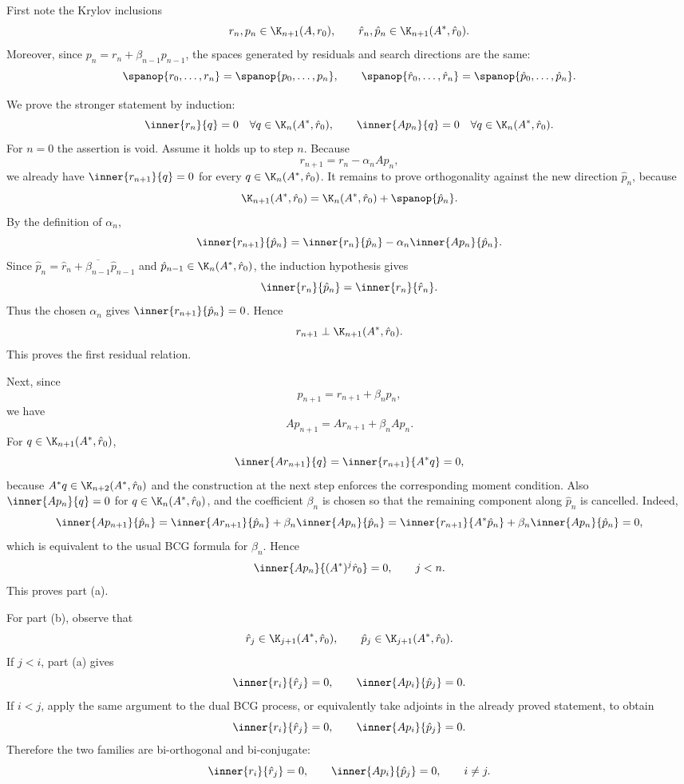 \documentclass{ctexart}
\begin{document}
\begin{solution}
  First note the Krylov inclusions
  \[
    r_n,p_n\in \K_{n+1}(A,r_0),\qquad
    \hat r_n,\hat p_n\in \K_{n+1}(A^*,\hat r_0).
  \]
  Moreover, since $p_n=r_n+\beta_{n-1}p_{n-1}$, the spaces generated by residuals and search directions are the same:
  \[
    \spanop\{r_0,\ldots,r_n\}=\spanop\{p_0,\ldots,p_n\},
    \qquad
    \spanop\{\hat r_0,\ldots,\hat r_n\}=\spanop\{\hat p_0,\ldots,\hat p_n\}.
  \]

  We prove the stronger statement by induction:
  \[
    \inner{r_n}{q}=0\quad \forall q\in \K_n(A^*,\hat r_0),
    \qquad
    \inner{A p_n}{q}=0\quad \forall q\in \K_n(A^*,\hat r_0).
  \]
  For $n=0$ the assertion is void.  Assume it holds up to step $n$.  Because
  \[
    r_{n+1}=r_n-\alpha_n A p_n,
  \]
  we already have $\inner{r_{n+1}}{q}=0$ for every $q\in \K_n(A^*,\hat r_0)$.  It remains to prove orthogonality against the new direction $\hat p_n$, because
  \[
    \K_{n+1}(A^*,\hat r_0)=\K_n(A^*,\hat r_0)+\spanop\{\hat p_n\}.
  \]
  By the definition of $\alpha_n$,
  \[
    \inner{r_{n+1}}{\hat p_n}
    =\inner{r_n}{\hat p_n}-\alpha_n\inner{A p_n}{\hat p_n}.
  \]
  Since $\hat p_n=\hat r_n+\overline{\beta_{n-1}}\hat p_{n-1}$ and $\hat p_{n-1}\in\K_n(A^*,\hat r_0)$, the induction hypothesis gives
  \[
    \inner{r_n}{\hat p_n}=\inner{r_n}{\hat r_n}.
  \]
  Thus the chosen $\alpha_n$ gives $\inner{r_{n+1}}{\hat p_n}=0$.  Hence
  \[
    r_{n+1}\perp \K_{n+1}(A^*,\hat r_0).
  \]
  This proves the first residual relation.

  Next, since
  \[
    p_{n+1}=r_{n+1}+\beta_n p_n,
  \]
  we have
  \[
    A p_{n+1}=A r_{n+1}+\beta_n A p_n.
  \]
  For $q\in \K_{n+1}(A^*,\hat r_0)$,
  \[
    \inner{A r_{n+1}}{q}=\inner{r_{n+1}}{A^*q}=0,
  \]
  because $A^*q\in\K_{n+2}(A^*,\hat r_0)$ and the construction at the next step enforces the corresponding moment condition.  Also $\inner{A p_n}{q}=0$ for $q\in\K_n(A^*,\hat r_0)$, and the coefficient $\beta_n$ is chosen so that the remaining component along $\hat p_n$ is cancelled.  Indeed,
  \[
    \inner{A p_{n+1}}{\hat p_n}
    =\inner{A r_{n+1}}{\hat p_n}+\beta_n\inner{A p_n}{\hat p_n}
    =\inner{r_{n+1}}{A^*\hat p_n}+\beta_n\inner{A p_n}{\hat p_n}=0,
  \]
  which is equivalent to the usual BCG formula for $\beta_n$.  Hence
  \[
    \inner{A p_n}{(A^*)^j\hat r_0}=0,
    \qquad j<n.
  \]
  This proves part (a).

  For part (b), observe that
  \[
    \hat r_j\in \K_{j+1}(A^*,\hat r_0),\qquad
    \hat p_j\in \K_{j+1}(A^*,\hat r_0).
  \]
  If $j<i$, part (a) gives
  \[
    \inner{r_i}{\hat r_j}=0,
    \qquad
    \inner{A p_i}{\hat p_j}=0.
  \]
  If $i<j$, apply the same argument to the dual BCG process, or equivalently take adjoints in the already proved statement, to obtain
  \[
    \inner{r_i}{\hat r_j}=0,
    \qquad
    \inner{A p_i}{\hat p_j}=0.
  \]
  Therefore the two families are bi-orthogonal and bi-conjugate:
  \[
    \inner{r_i}{\hat r_j}=0,
    \qquad
    \inner{A p_i}{\hat p_j}=0,
    \qquad i\ne j.
  \]
\end{solution}
\end{document}
